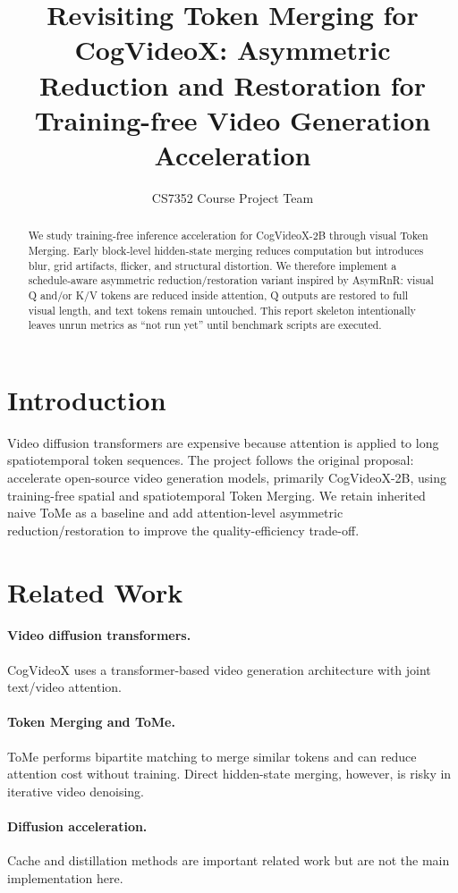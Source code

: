 \documentclass{article}
\title{Revisiting Token Merging for CogVideoX: Asymmetric Reduction and Restoration for Training-free Video Generation Acceleration}
\author{CS7352 Course Project Team}
\begin{document}
\maketitle

\begin{abstract}
We study training-free inference acceleration for CogVideoX-2B through visual Token Merging.
Early block-level hidden-state merging reduces computation but introduces blur, grid artifacts, flicker, and structural distortion.
We therefore implement a schedule-aware asymmetric reduction/restoration variant inspired by AsymRnR: visual Q and/or K/V tokens are reduced inside attention, Q outputs are restored to full visual length, and text tokens remain untouched.
This report skeleton intentionally leaves unrun metrics as ``not run yet'' until benchmark scripts are executed.
\end{abstract}

\section{Introduction}
Video diffusion transformers are expensive because attention is applied to long spatiotemporal token sequences.
The project follows the original proposal: accelerate open-source video generation models, primarily CogVideoX-2B, using training-free spatial and spatiotemporal Token Merging.
We retain inherited naive ToMe as a baseline and add attention-level asymmetric reduction/restoration to improve the quality-efficiency trade-off.

\section{Related Work}
\paragraph{Video diffusion transformers.}
CogVideoX uses a transformer-based video generation architecture with joint text/video attention.

\paragraph{Token Merging and ToMe.}
ToMe performs bipartite matching to merge similar tokens and can reduce attention cost without training.
Direct hidden-state merging, however, is risky in iterative video denoising.

\paragraph{Diffusion acceleration.}
Cache and distillation methods are important related work but are not the main implementation here.
\end{document}
